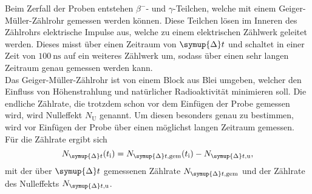     Beim Zerfall der Proben entstehen $\beta^{-}$- und $\gamma$-Teilchen,
    welche mit einem Geiger-Müller-Zählrohr gemessen werden können.
    Diese Teilchen lösen im Inneren des Zählrohrs elektrische Impulse aus,
    welche zu einem elektrischen Zählwerk geleitet werden.
    Dieses misst über einen Zeitraum von $\symup{\Delta} t$ und schaltet in einer Zeit von $\SI{100}{\nano\second}$ auf ein weiteres Zählwerk um,  
    sodass über einen sehr langen Zeitraum genau gemessen werden kann.\\
    Das Geiger-Müller-Zählrohr ist von einem Block aus Blei umgeben,
    welcher den Einfluss von Höhenstrahlung und natürlicher Radioaktivität minimieren soll.
    Die endliche Zählrate, 
    die trotzdem schon vor dem Einfügen der Probe gemessen wird,
    wird Nulleffekt $N_\text{U}$ genannt.
    Um diesen besonders genau zu bestimmen, 
    wird vor Einfügen der Probe über einen möglichst langen Zeitraum gemessen.\\
    Für die Zählrate ergibt sich 
    \begin{equation}
        N_{\symup{\Delta}t}(t_\text{i}) = N_{\symup{\Delta}t, \text{gem}}(t_\text{i}) - N_{\symup{\Delta}t, \text{u}} , \label{eqn:deltazählrate}
    \end{equation}
    mit der über $\symup{\Delta} t$ gemessenen Zählrate $N_{\symup{\Delta}t, \text{gem}}$ und der 
    Zählrate des Nulleffekts $N_{\symup{\Delta}t, \text{u}}$.
        